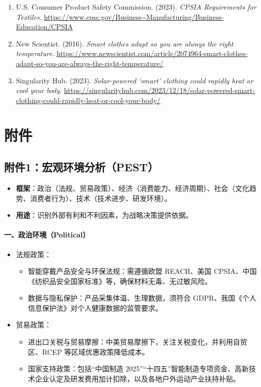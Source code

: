 \documentclass[UTF8]{report}
\theoremstyle{MyLineTheoremStyle} %
\theoremstyle{MyBlockTheoremStyle} %
\theoremstyle{MySubsubsectionStyle} %
\begin{document}
\begin{enumerate}
    \item U.S. Consumer Product Safety Commission. (2023). \textit{CPSIA Requirements for Textiles}. \url{https://www.cpsc.gov/Business--Manufacturing/Business-Education/CPSIA}
    \item New Scientist. (2016). \textit{Smart clothes adapt so you are always the right temperature}. \url{https://www.newscientist.com/article/2074964-smart-clothes-adapt-so-you-are-always-the-right-temperature/}
    \item Singularity Hub. (2023). \textit{Solar-powered ‘smart’ clothing could rapidly heat or cool your body}. \url{https://singularityhub.com/2023/12/18/solar-powered-smart-clothing-could-rapidly-heat-or-cool-your-body/}
\end{enumerate}

\chapter{附件}
\section{附件1：宏观环境分析（PEST）}

\begin{itemize}
    \item \textbf{框架}：政治（法规、贸易政策）、经济（消费能力、经济周期）、社会（文化趋势、消费者行为）、技术（技术进步、研发环境）。
    \item \textbf{用途}：识别外部有利和不利因素，为战略决策提供依据。
\end{itemize}
    \subsubsection{一、政治环境（Political）}
        \begin{itemize}
            \item 法规政策：
                \begin{itemize}
                    \item 智能穿戴产品安全与环保法规：需遵循欧盟 REACH、美国 CPSIA、中国《纺织品安全国家标准》等，确保材料无毒、无过敏风险。
                    \item 数据与隐私保护：产品采集体温、生理数据，须符合 GDPR、我国《个人信息保护法》对个人健康数据的监管要求。
                \end{itemize}
            \item 贸易政策：
                \begin{itemize}
                    \item 进出口关税与贸易摩擦：中美贸易摩擦下，关注关税变化，并利用自贸区、RCEP 等区域优惠政策降低成本。
                    \item 国家支持政策：包括“中国制造 2025”“十四五”智能制造专项资金、高新技术企业认定及研发费用加计扣除，以及各地户外运动产业扶持补贴。
                \end{itemize}
        \end{itemize}
\end{document}
